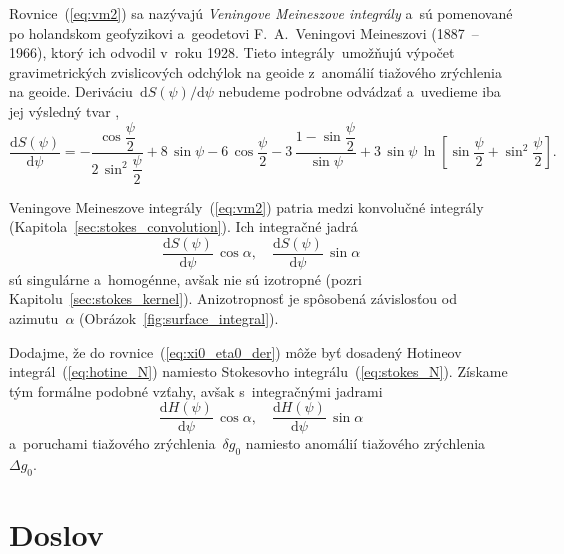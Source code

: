 \documentclass[a4paper, 12pt]{book}
\newcommand{\diff}{\mathrm d}
\begin{document}
Rovnice~(\ref{eq:vm2}) sa nazývajú \emph{Veningove Meineszove integrály} a~sú 
pomenované po holandskom geofyzikovi a~geodetovi F.~A.~Veningovi Meineszovi 
(1887~-- 1966), ktorý ich odvodil v~roku 1928.  Tieto integrály~umožňujú 
výpočet gravimetrických zvislicových odchýlok na geoide z~anomálií tiažového 
zrýchlenia na geoide.  Deriváciu~$\diff S(\psi) \slash \diff\psi$ nebudeme 
podrobne odvádzať a~uvedieme iba jej výsledný tvar
\parencite{MoritzPhysicalGeodesy},
%
\begin{equation}
\frac{\diff S(\psi)}{\diff \psi} = - \frac{\cos\dfrac{\psi}{2}}{2 \, 
\sin^2\dfrac{\psi}{2}} + 8 \, \sin\psi - 6 \, \cos\dfrac{\psi}{2} - 3\, \frac{1 
- \sin\dfrac{\psi}{2}}{\sin\psi} + 3 \, \sin\psi \, \ln \left[ 
\sin\dfrac{\psi}{2} + \sin^2\dfrac{\psi}{2} \right]{.}
\end{equation}

Veningove Meineszove integrály~(\ref{eq:vm2}) patria medzi konvolučné integrály 
(Kapitola~\ref{sec:stokes_convolution}).  Ich integračné jadrá
%
\begin{equation}
\label{eq:vm_kernels}
\frac{\diff S(\psi)}{\diff\psi} \, \cos\alpha{,} \quad \frac{\diff 
S(\psi)}{\diff\psi} \, \sin\alpha
\end{equation}
%
sú singulárne a~homogénne, avšak nie sú izotropné (pozri 
Kapitolu~\ref{sec:stokes_kernel}).  Anizotropnosť je spôsobená závislosťou od 
azimutu~$\alpha$ (Obrázok~\ref{fig:surface_integral}).

Dodajme, že do rovnice~(\ref{eq:xi0_eta0_der}) môže byť dosadený Hotineov 
integrál~(\ref{eq:hotine_N}) namiesto Stokesovho integrálu~(\ref{eq:stokes_N}).  
Získame tým formálne podobné vzťahy, avšak s~integračnými jadrami
%
\begin{equation}
\label{eq:vm_kernels2}
\frac{\diff H(\psi)}{\diff\psi} \, \cos\alpha{,} \quad \frac{\diff 
H(\psi)}{\diff\psi} \, \sin\alpha
\end{equation}
%
a~poruchami tiažového zrýchlenia~$\delta g_0$ namiesto anomálií tiažového 
zrýchlenia~$\Delta g_0$.






\chapter*{Doslov}
\end{document}
